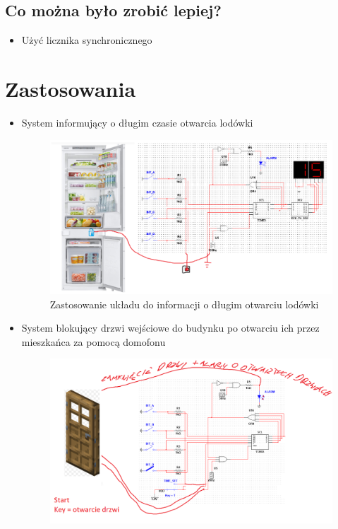 \documentclass{article}
\begin{document}
    \subsection*{Co można było zrobić lepiej?}
    \begin{itemize}
        \item Użyć licznika synchronicznego
    \end{itemize}

    \section{Zastosowania}

    \begin{itemize}
        \item System informujący o długim czasie otwarcia lodówki \begin{figure}[H]
            \centering
            \captionsetup{font=small, skip=2pt}
            \includegraphics[scale=0.7]{images/lodowka}
            \caption{Zastosowanie układu do informacji o długim otwarciu lodówki}
        \end{figure}
        \item System blokujący drzwi wejściowe do budynku po otwarciu ich przez mieszkańca za pomocą domofonu
        \begin{figure}[H]
            \centering
            \captionsetup{font=small, skip=2pt}
            \includegraphics[scale=0.3]{images/drzwi}

\end{figure}
\end{itemize}
\end{document}
